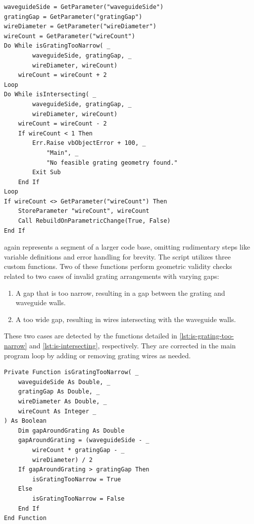 \documentclass[11pt,a4paper,twoside,openany]{report}
\begin{document}
\begin{lstlisting}[caption={Grating adjustment script}, label={lst:grating-adjustment}, language=VBScript]
waveguideSide = GetParameter("waveguideSide")
gratingGap = GetParameter("gratingGap")
wireDiameter = GetParameter("wireDiameter")
wireCount = GetParameter("wireCount")
Do While isGratingTooNarrow( _
        waveguideSide, gratingGap, _
        wireDiameter, wireCount)
    wireCount = wireCount + 2
Loop
Do While isIntersecting( _
        waveguideSide, gratingGap, _
        wireDiameter, wireCount)
    wireCount = wireCount - 2
    If wireCount < 1 Then
        Err.Raise vbObjectError + 100, _
            "Main", _
            "No feasible grating geometry found."
        Exit Sub
    End If
Loop
If wireCount <> GetParameter("wireCount") Then
    StoreParameter "wireCount", wireCount
    Call RebuildOnParametricChange(True, False)
End If
\end{lstlisting}

 again represents a segment of a larger code base, omitting rudimentary steps like variable definitions and error handling for brevity. The script utilizes three custom functions. Two of these functions perform geometric validity checks related to two cases of invalid grating arrangements with varying gaps:
\begin{enumerate}[label=(\alph*)]
    \item A gap that is too narrow, resulting in a gap between the grating and waveguide walls.
    \item  A too wide gap, resulting in wires intersecting with the waveguide walls.
\end{enumerate}
These two cases are detected by the functions detailed in \cref{lst:is-grating-too-narrow} and \cref{lst:is-intersecting}, respectively. They are corrected in the main program loop by adding or removing grating wires as needed.

\begin{lstlisting}[caption={Check for a gap around the grating}, label={lst:is-grating-too-narrow}, language=VBScript]
Private Function isGratingTooNarrow( _
    waveguideSide As Double, _
    gratingGap As Double, _
    wireDiameter As Double, _
    wireCount As Integer _
) As Boolean
    Dim gapAroundGrating As Double
    gapAroundGrating = (waveguideSide - _
        wireCount * gratingGap - _
        wireDiameter) / 2
    If gapAroundGrating > gratingGap Then
        isGratingTooNarrow = True
    Else
        isGratingTooNarrow = False
    End If
End Function
\end{lstlisting}
\end{document}
